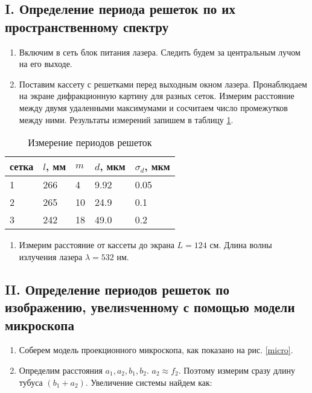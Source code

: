 \documentclass[a4paper,12pt]{article}
\begin{document}
\subsection*{I. Определение периода решеток по их пространственному спектру}

\begin{enumerate}
    \item Включим в сеть блок питания лазера. Следить будем за центральным лучом на его выходе.
    \item Поставим кассету с решетками перед выходным окном лазера. Пронаблюдаем на экране дифракционную картину для разных сеток. Измерим расстояние между двумя удаленными максимумами и сосчитаем число промежутков между ними. Результаты измерений запишем в таблицу \ref{table:1}.
\end{enumerate}

\begin{table}[!ht]
    \centering
    \caption{Измерение периодов решеток}
    \begin{tabular}{|l|l|l|l|l|}
        \hline
        сетка & $l$, мм & $m$ & $d$, мкм & $\sigma_d$, мкм \\ \hline
        1 & 266 & 4 & 9.92 & 0.05 \\ \hline
        2 & 265 & 10 & 24.9 & 0.1 \\ \hline
        3 & 242 & 18 & 49.0 & 0.2 \\ \hline
    \end{tabular}
    \label{table:1}
\end{table}

\begin{enumerate}[resume]
    \item Измерим расстояние от кассеты до экрана $L = 124$ см. Длина волны излучения лазера $\lambda = 532$ нм.
\end{enumerate}

\subsection*{II. Определение периодов решеток по изображению, увелиsченному с помощью модели микроскопа}

\begin{enumerate}[resume]
    \item Соберем модель проекционного микроскопа, как показано на рис. \ref{micro}.
    \item Определим расстояния $a_1, a_2, b_1, b_2$. $a_2 \approx f_2$. Поэтому измерим сразу длину тубуса $(b_1 + a_2)$. Увеличение системы найдем как:
\end{enumerate}
\end{document}
